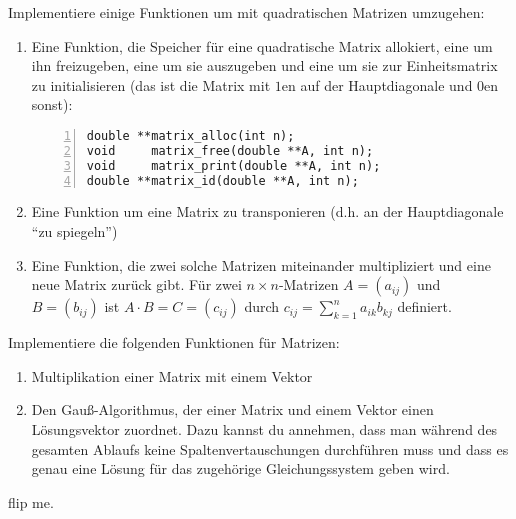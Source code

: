 \documentclass{uebungszettel}
\begin{document}
\newcommand{\ah}[2]{\ \\* \emph{(#1, #2)}\\}
\newcommand{\power}{\mathrm{power}}


\begin{aufg} Implementiere einige Funktionen um mit quadratischen Matrizen umzugehen:
\begin{enumerate}
\item Eine Funktion, die Speicher für eine quadratische Matrix allokiert, eine um ihn freizugeben, eine um sie auszugeben und eine um sie zur Einheitsmatrix zu initialisieren (das ist die Matrix mit $1$en auf der Hauptdiagonale und $0$en sonst):
\begin{codelisting}
\begin{lstlisting}[numbers=left,numberstyle=\tiny,frame=tlrb]
double **matrix_alloc(int n);
void     matrix_free(double **A, int n);
void     matrix_print(double **A, int n);
double **matrix_id(double **A, int n);
\end{lstlisting}
\end{codelisting}
\item Eine Funktion um eine Matrix zu transponieren (d.h. an der Hauptdiagonale ``zu spiegeln'')
\item Eine Funktion, die zwei solche Matrizen miteinander multipliziert und eine neue Matrix zurück gibt. Für zwei $n \times n$-Matrizen $A = (a_{ij})$ und $B = (b_{ij})$ ist $A \cdot B = C = (c_{ij})$ durch $c_{ij} = \sum_{k=1}^n a_{ik} b_{kj}$ definiert.
\end{enumerate}
\end{aufg}

\begin{aufg}
Implementiere die folgenden Funktionen für Matrizen:
\begin{enumerate}
  \item Multiplikation einer Matrix mit einem Vektor
  \item Den Gauß-Algorithmus, der einer Matrix und einem Vektor einen Lösungsvektor zuordnet. Dazu kannst du annehmen, dass man während des gesamten Ablaufs keine Spaltenvertauschungen durchführen muss und dass es genau eine Lösung für das zugehörige Gleichungssystem geben wird. 
\end{enumerate}
\end{aufg}

\vfill
\begin{center} flip me. \end{center}
\vfill 
\newpage
\end{document}
